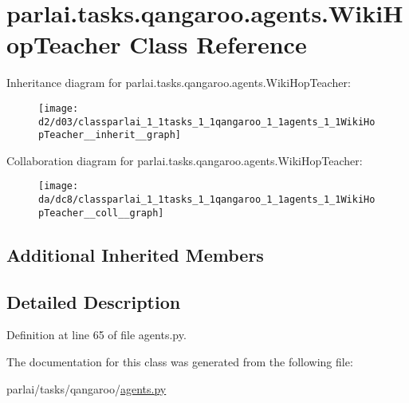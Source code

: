 \hypertarget{classparlai_1_1tasks_1_1qangaroo_1_1agents_1_1WikiHopTeacher}{}\section{parlai.\+tasks.\+qangaroo.\+agents.\+Wiki\+Hop\+Teacher Class Reference}
\label{classparlai_1_1tasks_1_1qangaroo_1_1agents_1_1WikiHopTeacher}


Inheritance diagram for parlai.\+tasks.\+qangaroo.\+agents.\+Wiki\+Hop\+Teacher\+:
\nopagebreak
\begin{figure}[H]
\begin{center}
\leavevmode
\texttt{[image: d2/d03/classparlai\_1\_1tasks\_1\_1qangaroo\_1\_1agents\_1\_1WikiHopTeacher\_\_inherit\_\_graph]}
\end{center}
\end{figure}


Collaboration diagram for parlai.\+tasks.\+qangaroo.\+agents.\+Wiki\+Hop\+Teacher\+:
\nopagebreak
\begin{figure}[H]
\begin{center}
\leavevmode
\texttt{[image: da/dc8/classparlai\_1\_1tasks\_1\_1qangaroo\_1\_1agents\_1\_1WikiHopTeacher\_\_coll\_\_graph]}
\end{center}
\end{figure}
\subsection*{Additional Inherited Members}


\subsection{Detailed Description}


Definition at line 65 of file agents.\+py.



The documentation for this class was generated from the following file\+:\begin{DoxyCompactItemize}
\item 
parlai/tasks/qangaroo/\hyperlink{parlai_2tasks_2qangaroo_2agents_8py}{agents.\+py}\end{DoxyCompactItemize}
